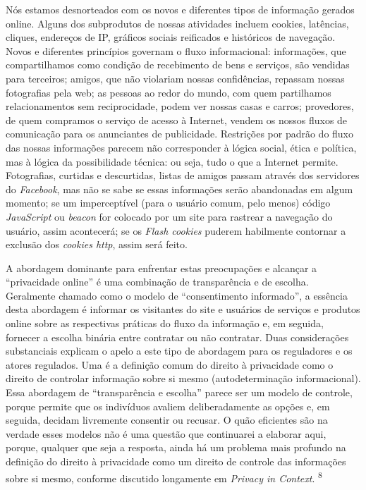 Nós estamos desnorteados com os novos e diferentes tipos de informação
gerados online. Alguns dos subprodutos de nossas atividades incluem
cookies, latências, cliques, endereços de IP, gráficos sociais
reificados e históricos de navegação. Novos e diferentes princípios
governam o fluxo informacional: informações, que compartilhamos como
condição de recebimento de bens e serviços, são vendidas para terceiros;
amigos, que não violariam nossas confidências, repassam nossas
fotografias pela web; as pessoas ao redor do mundo, com quem partilhamos
relacionamentos sem reciprocidade, podem ver nossas casas e carros;
provedores, de quem compramos o serviço de acesso à Internet, vendem os
nossos fluxos de comunicação para os anunciantes de publicidade.
Restrições por padrão do fluxo das nossas informações parecem não
corresponder à lógica social, ética e política, mas à lógica da
possibilidade técnica: ou seja, tudo o que a Internet permite.
Fotografias, curtidas e descurtidas, listas de amigos passam através dos
servidores do \emph{Facebook}, mas não se sabe se essas informações
serão abandonadas em algum momento; se um imperceptível (para o usuário
comum, pelo menos) código \emph{JavaScript} ou \emph{beacon} for
colocado por um site para rastrear a navegação do usuário, assim
acontecerá; se os \emph{Flash cookies} puderem habilmente contornar a
exclusão dos \emph{cookies http}, assim será feito.

A abordagem dominante para enfrentar estas preocupações e alcançar a
``privacidade online'' é uma combinação de transparência e de escolha.
Geralmente chamado como o modelo de ``consentimento informado'', a
essência desta abordagem é informar os visitantes do site e usuários de
serviços e produtos online sobre as respectivas práticas do fluxo da
informação e, em seguida, fornecer a escolha binária entre contratar ou
não contratar. Duas considerações substanciais explicam o apelo a este
tipo de abordagem para os reguladores e os atores regulados. Uma é a
definição comum do direito à privacidade como o direito de controlar
informação sobre si mesmo (autodeterminação informacional). Essa
abordagem de ``transparência e escolha'' parece ser um modelo de
controle, porque permite que os indivíduos avaliem deliberadamente as
opções e, em seguida, decidam livremente consentir ou recusar. O quão
eficientes são na verdade esses modelos não é uma questão que
continuarei a elaborar aqui, porque, qualquer que seja a resposta, ainda
há um problema mais profundo na definição do direito à privacidade como
um direito de controle das informações sobre si mesmo, conforme
discutido longamente em \emph{Privacy in Context}. \textsuperscript{{8}}


